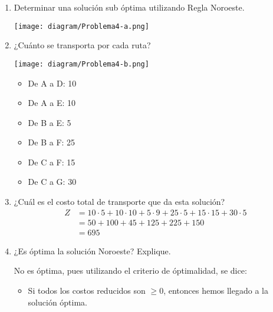 \documentclass{templateNote}
\begin{document}
\begin{enumerate}
    \renewcommand{\labelenumi}{\alph{enumi})}
    \item Determinar una soluci\'on sub \'optima utilizando Regla Noroeste.
    \begin{center}
        \texttt{[image: diagram/Problema4-a.png]}
    \end{center}

    \item ¿Cu\'anto se transporta por cada ruta?
    
    \begin{minipage}{0.6\textwidth}
        \begin{flushleft}
            \texttt{[image: diagram/Problema4-b.png]}
        \end{flushleft}
    \end{minipage}
    \hfill
    \begin{minipage}{0.3\textwidth}
        \begin{itemize}
            \item De A a D: 10
            \item De A a E: 10
            \item De B a E: 5
            \item De B a F: 25
            \item De C a F: 15
            \item De C a G: 30
        \end{itemize}
    \end{minipage}
    \item ¿Cu\'al es el costo total de transporte que da esta soluci\'on?
    \begin{align*}
        Z &= 10 \cdot 5 + 10 \cdot 10 + 5 \cdot 9 + 25 \cdot 5 + 15 \cdot 15 + 30 \cdot 5 \\
        &= 50 + 100 + 45 + 125 + 225 + 150 \\
        &= 695
    \end{align*}
    
    \newpage
    \item ¿Es \'optima la soluci\'on Noroeste? Explique.
    
    No es \'optima, pues utilizando el criterio de \'optimalidad, se dice:
    
    \begin{itemize}
        \item Si todos los costos reducidos son $\geq 0$, entonces hemos llegado a la soluci\'on \'optima.
    \end{itemize}


\end{enumerate}
\end{document}
